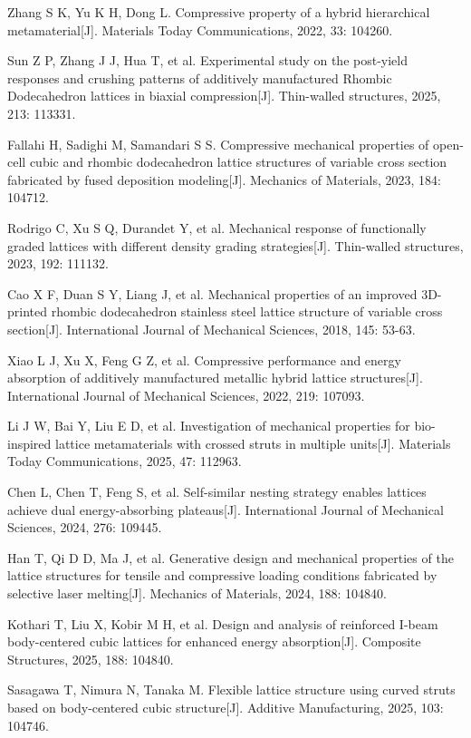 \documentclass{article} %
\begin{document}
\noindent [24] Zhang S K, Yu K H, Dong L. Compressive property of a hybrid hierarchical metamaterial[J]. Materials Today Communications, 2022, 33: 104260.

\noindent [25] Sun Z P, Zhang J J, Hua T, et al. Experimental study on the post-yield responses and crushing patterns of additively manufactured Rhombic Dodecahedron lattices in biaxial compression[J]. Thin-walled structures, 2025, 213: 113331.

\noindent [26] Fallahi H, Sadighi M, Samandari S S. Compressive mechanical properties of open-cell cubic and rhombic dodecahedron lattice structures of variable cross section fabricated by fused deposition modeling[J]. Mechanics of Materials, 2023, 184: 104712.

\noindent [27] Rodrigo C, Xu S Q, Durandet Y, et al. Mechanical response of functionally graded lattices with different density grading strategies[J]. Thin-walled structures, 2023, 192: 111132.

\noindent [28] Cao X F, Duan S Y, Liang J, et al. Mechanical properties of an improved 3D-printed rhombic dodecahedron stainless steel lattice structure of variable cross section[J]. International Journal of Mechanical Sciences, 2018, 145: 53-63.

\noindent [29] Xiao L J, Xu X, Feng G Z, et al. Compressive performance and energy absorption of additively manufactured metallic hybrid lattice structures[J]. International Journal of Mechanical Sciences, 2022, 219: 107093.

\noindent [30] Li J W, Bai Y, Liu E D, et al. Investigation of mechanical properties for bio-inspired lattice metamaterials with crossed struts in multiple units[J]. Materials Today Communications, 2025, 47: 112963.

\noindent [31] Chen L, Chen T, Feng S, et al. Self-similar nesting strategy enables lattices achieve dual energy-absorbing plateaus[J]. International Journal of Mechanical Sciences, 2024, 276: 109445.

\noindent [32] Han T, Qi D D, Ma J, et al. Generative design and mechanical properties of the lattice structures for tensile and compressive loading conditions fabricated by selective laser melting[J]. Mechanics of Materials, 2024, 188: 104840.

\noindent [33] Kothari T, Liu X, Kobir M H, et al. Design and analysis of reinforced I-beam body-centered cubic lattices for enhanced energy absorption[J]. Composite Structures, 2025, 188: 104840.

\noindent [34] Sasagawa T, Nimura N, Tanaka M. Flexible lattice structure using curved struts based on body-centered cubic structure[J]. Additive Manufacturing, 2025, 103: 104746.
\end{document}

